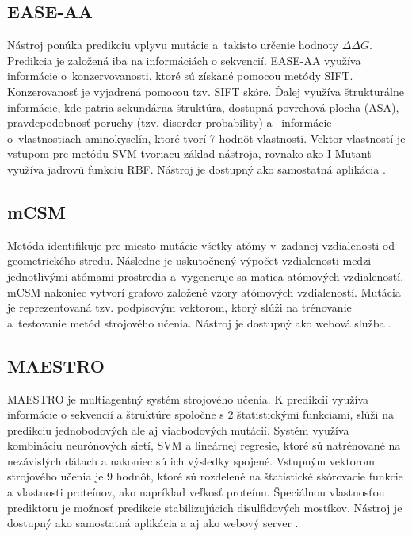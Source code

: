\subsection{EASE-AA}

Nástroj ponúka predikciu vplyvu mutácie a~takisto určenie hodnoty $\Delta\Delta G$. Predikcia je založená iba na informáciách o sekvencií. EASE-AA využíva informácie o~konzervovanosti, ktoré sú získané pomocou metódy SIFT. Konzerovanosť je vyjadrená pomocou tzv. SIFT skóre. Ďalej využíva štrukturálne informácie, kde patria sekundárna štruktúra, dostupná povrchová plocha (ASA), pravdepodobnosť poruchy (tzv. disorder probability) a~ informácie o~vlastnostiach aminokyselín, ktoré tvorí 7 hodnôt vlastností. Vektor vlastností je vstupom pre metódu SVM tvoriacu základ nástroja, rovnako ako I-Mutant využíva jadrovú funkciu RBF. Nástroj je dostupný ako samostatná aplikácia \cite{ease}.
   
\subsection{mCSM}

Metóda identifikuje pre miesto mutácie všetky atómy v~zadanej vzdialenosti od geometrického stredu. Následne je uskutočnený výpočet vzdialenosti medzi jednotlivými atómami prostredia a~vygeneruje sa matica atómových vzdialeností. mCSM nakoniec vytvorí grafovo založené vzory atómových vzdialeností. Mutácia je reprezentovaná tzv. podpisovým vektorom, ktorý slúži na trénovanie a~testovanie metód strojového učenia. Nástroj je dostupný ako webová služba \cite{mcsm}.

\subsection{MAESTRO}

MAESTRO je multiagentný systém strojového učenia. K predikcií využíva informácie o sekvencií a štruktúre spoločne s 2 štatistickými funkciami, slúži na predikciu jednobodových ale aj viacbodových mutácií. Systém využíva kombináciu neurónových sietí, SVM a lineárnej regresie, ktoré sú natrénované na nezávislých dátach a nakoniec sú ich výsledky spojené. Vstupným vektorom strojového učenia je 9 hodnôt, ktoré sú rozdelené na štatistické skórovacie funkcie a vlastnosti proteínov, ako napríklad veľkosť proteínu. Špeciálnou vlastnosťou prediktoru je možnosť predikcie stabilizujúcich disulfidových mostíkov. Nástroj je dostupný ako samostatná aplikácia a aj ako webový server \cite{maestro}.

